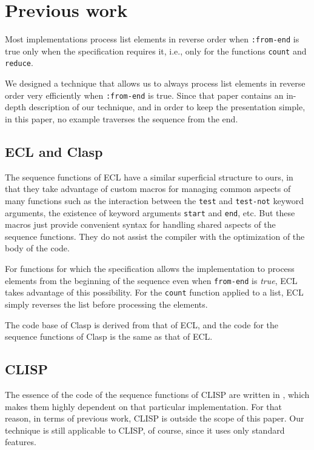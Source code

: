 \section{Previous work}

Most implementations process list elements in reverse order when
\texttt{:from-end} is true only when the specification requires it,
i.e., only for the functions \texttt{count} and \texttt{reduce}.

We designed a technique \cite{Durand:2015:ELS:reverse} that allows us
to always process list elements in reverse order very efficiently when
\texttt{:from-end} is true.  Since that paper contains an in-depth
description of our technique, and in order to keep the presentation
simple, in this paper, no example traverses the sequence from the
end.

\subsection{ECL and Clasp}

The sequence functions of ECL have a similar superficial structure to
ours, in that they take advantage of custom macros for managing common
aspects of many functions such as the interaction between the
\texttt{test} and \texttt{test-not} keyword arguments, the existence
of keyword arguments \texttt{start} and \texttt{end}, etc.
But these macros just provide convenient syntax for handling shared
aspects of the sequence functions.  They do not assist the compiler
with the optimization of the body of the code.

For functions for which the \commonlisp{} specification allows the
implementation to process elements from the beginning of the sequence
even when \texttt{from-end} is \emph{true}, ECL takes advantage of
this possibility.  For the \texttt{count} function applied to a list,
ECL simply reverses the list before processing the elements.

The \commonlisp{} code base of Clasp is derived from that of ECL, and
the code for the sequence functions of Clasp is the same as that of
ECL.

\subsection{CLISP}

The essence of the code of the sequence functions of CLISP are written
in \clanguage{}, which makes them highly dependent on that particular
implementation.  For that reason, in terms of previous work, CLISP is
outside the scope of this paper.  Our technique is still applicable to
CLISP, of course, since it uses only standard \commonlisp{} features.

